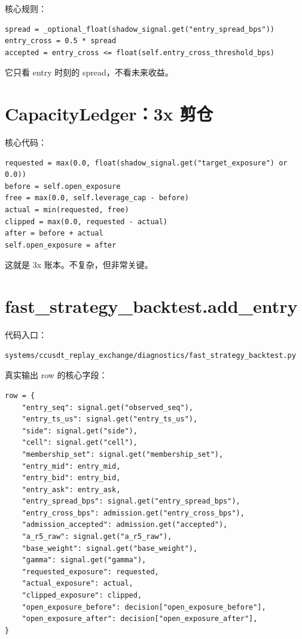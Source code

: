 核心规则：

\begin{lstlisting}
spread = _optional_float(shadow_signal.get("entry_spread_bps"))
entry_cross = 0.5 * spread
accepted = entry_cross <= float(self.entry_cross_threshold_bps)
\end{lstlisting}

它只看 entry 时刻的 spread，不看未来收益。

\section{CapacityLedger：3x 剪仓}

核心代码：

\begin{lstlisting}
requested = max(0.0, float(shadow_signal.get("target_exposure") or 0.0))
before = self.open_exposure
free = max(0.0, self.leverage_cap - before)
actual = min(requested, free)
clipped = max(0.0, requested - actual)
after = before + actual
self.open_exposure = after
\end{lstlisting}

这就是 3x 账本。不复杂，但非常关键。

\section{fast\_strategy\_backtest.add\_entry}

代码入口：

\begin{lstlisting}
systems/ccusdt_replay_exchange/diagnostics/fast_strategy_backtest.py
\end{lstlisting}

真实输出 row 的核心字段：

\begin{lstlisting}
row = {
    "entry_seq": signal.get("observed_seq"),
    "entry_ts_us": signal.get("entry_ts_us"),
    "side": signal.get("side"),
    "cell": signal.get("cell"),
    "membership_set": signal.get("membership_set"),
    "entry_mid": entry_mid,
    "entry_bid": entry_bid,
    "entry_ask": entry_ask,
    "entry_spread_bps": signal.get("entry_spread_bps"),
    "entry_cross_bps": admission.get("entry_cross_bps"),
    "admission_accepted": admission.get("accepted"),
    "a_r5_raw": signal.get("a_r5_raw"),
    "base_weight": signal.get("base_weight"),
    "gamma": signal.get("gamma"),
    "requested_exposure": requested,
    "actual_exposure": actual,
    "clipped_exposure": clipped,
    "open_exposure_before": decision["open_exposure_before"],
    "open_exposure_after": decision["open_exposure_after"],
}
\end{lstlisting}

